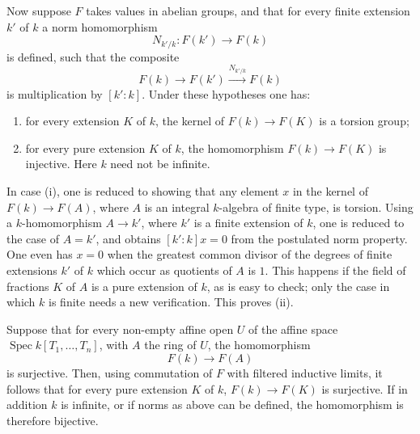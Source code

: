 \documentclass[11pt]{article}
\newcommand{\Spec}{\operatorname{Spec}}
\begin{document}
Now suppose \(F\) takes values in abelian groups, and that for every finite extension \(k'\) of \(k\) a norm homomorphism
\[
  N_{k'/k}:F(k')\longrightarrow F(k)
\]
is defined, such that the composite
\[
  F(k)\longrightarrow F(k')\xrightarrow{N_{k'/k}}F(k)
\]
is multiplication by \([k':k]\). Under these hypotheses one has:
\begin{enumerate}[label=(\roman*)]
\item for every extension \(K\) of \(k\), the kernel of \(F(k)\to F(K)\) is a torsion group;
\item for every pure extension \(K\) of \(k\), the homomorphism \(F(k)\to F(K)\) is injective. Here \(k\) need not be infinite.
\end{enumerate}
In case (i), one is reduced to showing that any element \(x\) in the kernel of \(F(k)\to F(A)\), where \(A\) is an integral \(k\)-algebra of finite type, is torsion. Using a \(k\)-homomorphism \(A\to k'\), where \(k'\) is a finite extension of \(k\), one is reduced to the case of \(A=k'\), and obtains \([k':k]x=0\) from the postulated norm property. One even has \(x=0\) when the greatest common divisor of the degrees of finite extensions \(k'\) of \(k\) which occur as quotients of \(A\) is \(1\). This happens if the field of fractions \(K\) of \(A\) is a pure extension of \(k\), as is easy to check; only the case in which \(k\) is finite needs a new verification. This proves (ii).

Suppose that for every non-empty affine open \(U\) of the affine space \(\Spec k[T_1,\ldots,T_n]\), with \(A\) the ring of \(U\), the homomorphism
\[
  F(k)\longrightarrow F(A)
\]
is surjective. Then, using commutation of \(F\) with filtered inductive limits, it follows that for every pure extension \(K\) of \(k\), \(F(k)\to F(K)\) is surjective. If in addition \(k\) is infinite, or if norms as above can be defined, the homomorphism is therefore bijective.
\end{document}

